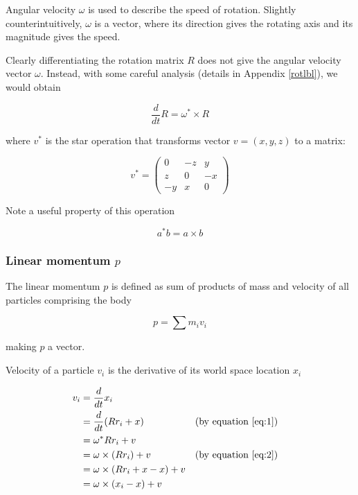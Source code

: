 \documentclass[12pt,a4paper,twoside,openright]{report}
\begin{document}
Angular velocity $\omega$ is used to describe the speed of rotation. Slightly counterintuitively, $\omega$ is a vector, where its direction gives the rotating axis and its magnitude gives the speed.

Clearly differentiating the rotation matrix $R$ does not give the angular velocity vector $\omega$. Instead, with some careful analysis (details in Appendix \ref{rotlbl}), we would obtain %

\begin{equation}
\frac{d}{dt}R = \omega ^* \times R
\end{equation}

where $v^*$ is the star operation that transforms vector $v=(x, y, z)$ to a matrix:

\begin{equation}
    v^* = \begin{pmatrix}
        0 & -z & y \\
        z & 0 & -x \\
        -y & x & 0
    \end{pmatrix}
\end{equation}

Note a useful property of this operation

\begin{equation}
    a^* b = a \times b\label{eq:2}
\end{equation}

\subsubsection{Linear momentum $p$} 

The linear momentum $p$ is defined as sum of products of mass and velocity of all particles comprising the body

\begin{equation}
    p = \sum m_i v_i
\end{equation}

making $p$ a vector.

Velocity of a particle $v_i$ is the derivative of its world space location $x_i$

\begin{align*}
    v_i &= \frac{d}{dt}x_i \\
        &= \frac{d}{dt}(R r_i + x) && \text{(by equation \eqref{eq:1})} \\
        &= \omega^* R r_i + v \\
        &= \omega \times (R r_i) + v && \text{(by equation \eqref{eq:2})} \\
        &= \omega \times (R r_i + x - x) + v \\
        &= \omega \times (x_i - x) + v
\end{align*}
\end{document}
